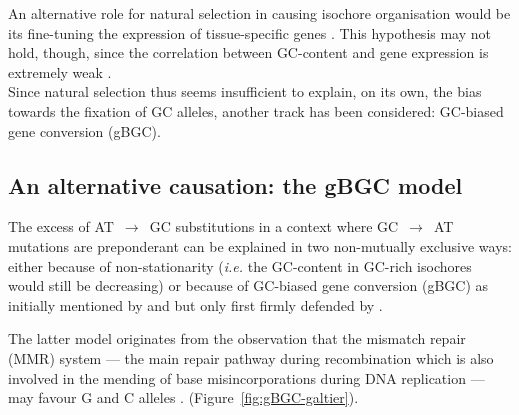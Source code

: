An alternative role for natural selection in causing isochore organisation would be its fine-tuning the expression of tissue-specific genes \citep{vinogradov2003isochores,vinogradov2005noncoding}.
This hypothesis may not hold, though, since the correlation between GC-content and gene expression is extremely weak \citep[reviewed in \citealp{duret2009biased}]{semon2005relationship,semon2006no}.\\


Since natural selection thus seems insufficient to explain, on its own, the bias towards the fixation of GC alleles, another track has been considered: GC-biased gene conversion (gBGC).





\subsection{An alternative causation: the gBGC model}

The excess of AT~$\rightarrow$~GC substitutions in a context where GC~$\rightarrow$~AT mutations are preponderant can be explained in two non-mutually exclusive ways: either because of non-stationarity (\textit{i.e.} the GC-content in GC-rich isochores would still be decreasing) or because of GC-biased gene conversion (gBGC) as initially mentioned by \citet{holmquist1992chromosome} and \citet{eyre-walker1993recombination,eyre-walker1999evidence} but only first firmly defended by \citet{galtier2001gccontent}.

The latter model originates from the observation that the mismatch repair (MMR) system — the main repair pathway during recombination \citep[reviewed in \citealp{evans2000roles} and \citealp{spies2015mismatch}]{alani1994interaction,nicolas1994polarity} which is also involved in the mending of base misincorporations during DNA replication \citep{surtees2004mismatch} — may favour G and C alleles \citep{brown1988different}. (Figure~\ref{fig:gBGC-galtier}). \\


